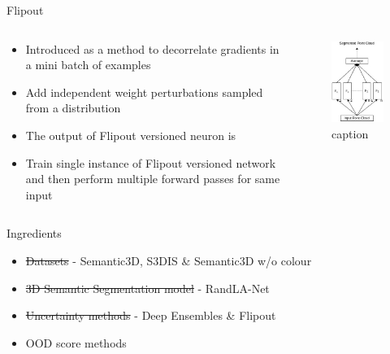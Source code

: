\documentclass[aspectratio=169]{beamer}
\begin{document}
\begin{frame}{Flipout}
    \begin{columns}
        \begin{column}{0.5\textwidth}
            \begin{itemize}
                \item Introduced as a method to decorrelate gradients in a mini batch of examples
                \item Add independent weight perturbations sampled from a distribution
                \item The output of Flipout versioned neuron is 
                
                \item Train single instance of Flipout versioned network and then perform multiple forward passes for same input
            \end{itemize}
        \end{column}
        \begin{column}{0.5\textwidth}
            \begin{figure}
                \centering
                \includegraphics[scale=0.5]{images/flipout.jpg}
                \caption{caption}
                \label{fig:flipout_work}
            \end{figure}
        \end{column}
    \end{columns}
\end{frame}
\begin{frame}{Ingredients}
    \begin{itemize}
        \item \st{Datasets} - Semantic3D, S3DIS \& Semantic3D w/o colour
        \item \st{3D Semantic Segmentation model} - RandLA-Net
        \item \st{Uncertainty methods} - Deep Ensembles \& Flipout
        \item OOD score methods
    \end{itemize}
\end{frame}
\end{document}
